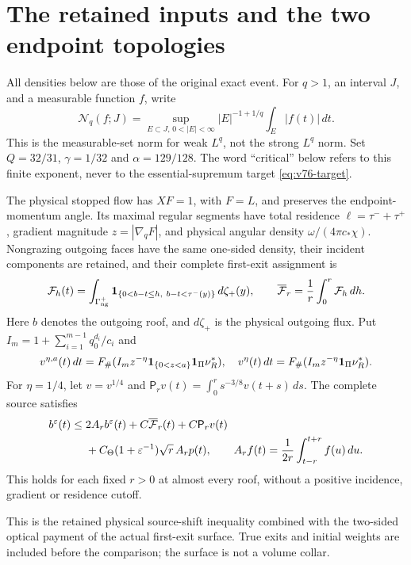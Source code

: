\section{The retained inputs and the two endpoint topologies}
\label{sec:v91-inputs}
All densities below are those of the original exact event. For
$q>1$, an interval $J$, and a measurable function $f$, write
\begin{equation}\label{eq:v91-norm}
 \mathcal N_q(f;J)=\sup_{E\subset J,\,0<|E|<\infty}
                  |E|^{-1+1/q}\int_E|f(t)|\,dt.
\end{equation}
This is the measurable-set norm for weak $L^q$, not the strong
$L^q$ norm. Set $Q=32/31$, $\gamma=1/32$ and $\alpha=129/128$.
The word ``critical'' below refers to this finite exponent, never
to the essential-supremum target \eqref{eq:v76-target}.

\begin{inputstatement}
\label{input:v91-comparison}
The physical stopped flow has $XF=1$, with $F=L$, and preserves
the endpoint-momentum angle. Its maximal regular segments have total
residence $\ell=\tau^-+\tau^+$, gradient magnitude $z=|\nabla_qF|$,
and physical angular density $\omega/(4\pi c_*\chi)$. Nongrazing
outgoing faces have the same one-sided density, their incident
components are retained, and their complete first-exit assignment is
\[
 \mathcal F_h(t)=\int_{\Gamma_{\rm ng}^+}
 \mathbf1_{\{0<b-t\le h,\ b-t<\tau^-(y)\}}\,d\zeta_+(y),
 \qquad \overline{\mathcal F}_r=\frac1r\int_0^r\mathcal F_h\,dh.
\]
Here $b$ denotes the outgoing roof, and $d\zeta_+$ is the physical
outgoing flux. Put $I_m=1+\sum_{i=1}^{m-1}q_0^{d_i}/c_i$ and
\[
 v^{\eta,a}(t)\,dt=F_\#(I_mz^{-\eta}\mathbf1_{\{0<z<a\}}\mathbf1_\Pi\nu_R^*),
 \quad v^\eta(t)\,dt=F_\#(I_mz^{-\eta}\mathbf1_\Pi\nu_R^*).
\]
For $\eta=1/4$, let $v=v^{1/4}$ and
$\mathsf P_rv(t)=\int_0^r s^{-3/8}v(t+s)\,ds$. The complete
source satisfies
\begin{align}
 b^\varepsilon(t)\le{}&2A_rb^\varepsilon(t)
 +C\overline{\mathcal F}_r(t)+C\mathsf P_rv(t)\notag\\
 &+C_\Theta(1+\varepsilon^{-1})\sqrt r\,A_rp(t),
 \qquad A_rf(t)=\frac1{2r}\int_{t-r}^{t+r}f(u)\,du.
 \label{eq:v91-source-comparison}
\end{align}
This holds for each fixed $r>0$ at almost every roof, without a
positive incidence, gradient or residence cutoff.
\end{inputstatement}
This is the retained physical source-shift inequality combined with
the two-sided optical payment of the actual first-exit surface.
True exits and initial weights are included before the comparison;
the surface is not a volume collar.

